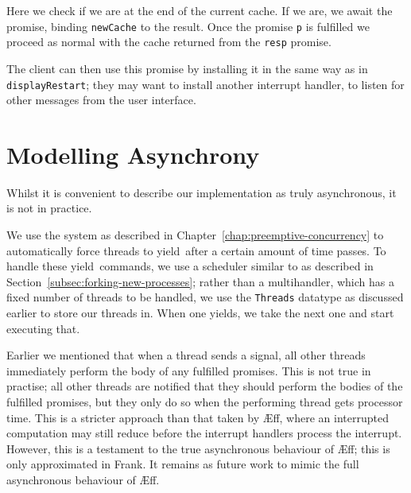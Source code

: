 \documentclass[msc,deptreport,cs]{infthesis} %
\newcommand{\code}[1]{\lstinline{#1}}
\newcommand\aeff{{\AE}ff\xspace}
\newcommand\yield{\textsf{yield}\xspace}
\begin{document}
\noindent Here we check if we are at the end of the current cache. If we are, we
await the promise, binding \code{newCache} to the result. Once the promise
\code{p} is fulfilled we proceed as normal with the cache returned from the
\code{resp} promise.

The client can then use this promise by installing it in the same way as in
\code{displayRestart}; they may want to install another interrupt handler, to
listen for other messages from the user interface.

\section{Modelling Asynchrony}

Whilst it is convenient to describe our implementation as truly asynchronous, it
is not in practice.

We use the system as described in Chapter~\ref{chap:preemptive-concurrency} to
automatically force threads to \yield~after a certain amount of time passes. To
handle these \yield~commands, we use a scheduler similar to as described in
Section~\ref{subsec:forking-new-processes}; rather than a multihandler, which
has a fixed number of threads to be handled, we use the \code{Threads} datatype
as discussed earlier to store our threads in. When one yields, we take the next
one and start executing that.

Earlier we mentioned that when a thread sends a signal, all other threads
immediately perform the body of any fulfilled promises. This is not true in
practise; all other threads are notified that they should perform the bodies of
the fulfilled promises, but they only do so when the performing thread gets
processor time.
%
This is a stricter approach than that taken by \aeff, where an interrupted
computation may still reduce before the interrupt handlers process the
interrupt. However, this is a testament to the true asynchronous behaviour of
\aeff; this is only approximated in Frank. It remains as future work to mimic
the full asynchronous behaviour of \aeff.


\end{document}
